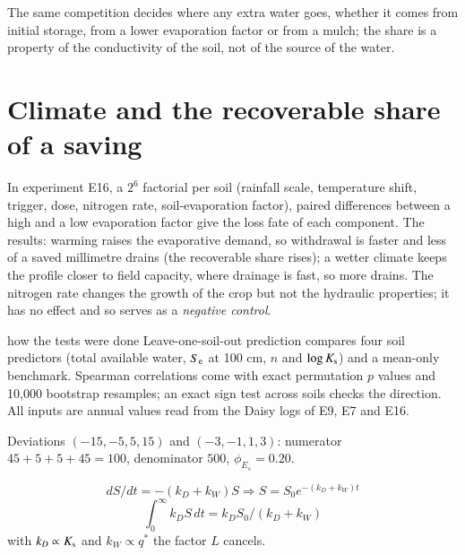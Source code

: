 


The same competition decides where any extra water goes, whether it comes from initial storage, from a lower evaporation factor or from a mulch; the share is a property of the conductivity of the soil, not of the source of the water.

\section{Climate and the recoverable share of a saving}
In experiment E16, a $2^6$ factorial per soil (rainfall scale, temperature shift, trigger, dose, nitrogen rate, soil-evaporation factor), paired differences between a high and a low evaporation factor give the loss fate of each component. The results: warming raises the evaporative demand, so withdrawal is faster and less of a saved millimetre drains (the recoverable share rises); a wetter climate keeps the profile closer to field capacity, where drainage is fast, so more drains. The nitrogen rate changes the growth of the crop but not the hydraulic properties; it has no effect and so serves as a \emph{negative control}.

\begin{daisybox}{how the tests were done}
Leave-one-soil-out prediction compares four soil predictors (total available water, $S_{\mathrm e}$ at 100 cm, $n$ and $\log K_{\mathrm s}$) and a mean-only benchmark. Spearman correlations come with exact permutation $p$ values and 10,000 bootstrap resamples; an exact sign test across soils checks the direction. All inputs are annual values read from the Daisy logs of E9, E7 and E16.
\end{daisybox}

\sol {}\ans Deviations $(-15,-5,5,15)$ and $(-3,-1,1,3)$: numerator $45+5+5+45=100$, denominator $500$, $\phi_{E_s}=0.20$. \finans

\sol  \[dS/dt=-(k_D+k_W)S\Rightarrow S=S_0e^{-(k_D+k_W)t}\]
\[\int_0^\infty k_DS\,dt=k_DS_0/(k_D+k_W)\]
with $k_D\propto K_{\mathrm s}$ and $k_W\propto q^*$ the factor $L$ cancels. \finans

